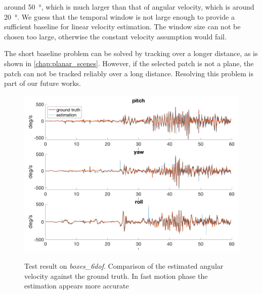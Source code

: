   around \SI{50}{\degree}, which is much larger than that of angular
  velocity, which is around \SI{20}{\degree}. We guess that the
  temporal window is not large enough to provide a sufficient baseline
  for linear velocity estimation. The window size can not be chosen
  too large, otherwise the constant velocity assumption would fail.

  The short baseline problem can be solved by tracking over a longer
  distance, as is shown in \cref{chap:planar_scenes}. However, if the
  selected patch is not a plane, the patch can not be tracked reliably
  over a long distance. Resolving this problem is part of our future
  works.

\begin{figure}
  \centering \includegraphics[width =
  \textwidth]{images/boxes_6dof_rotation_.png}
  \label{fig:boxes_6dof_rotation}
  \caption{Test result on \emph{boxes\_6dof}. Comparison of the
    estimated angular velocity against the ground truth. In fast
    motion phase the estimation appears more accurate}
\end{figure}

